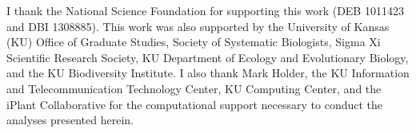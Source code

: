 I thank the National Science Foundation for supporting this work (DEB
1011423 and DBI 1308885).
This work was also supported by the University of Kansas (KU) Office of Graduate
Studies, Society of Systematic Biologists, Sigma Xi Scientific Research
Society, KU Department of Ecology and Evolutionary Biology, and the KU
Biodiversity Institute.
I also thank Mark Holder, the KU Information and Telecommunication Technology
Center, KU Computing Center, and the iPlant Collaborative for the computational
support necessary to conduct the analyses presented herein.
